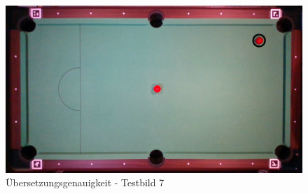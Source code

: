 \begin{figure}[h!]
    \begin{center}
        \includegraphics[width=0.8\linewidth]{../common/07_appendix/resources/01_translation/06_translation_testbild_7.png}
    \end{center}
    \caption{Übersetzungsgenauigkeit - Testbild 7}
    \label{fig:uebersetzungsgenauigkeit:testbild:7}
\end{figure}